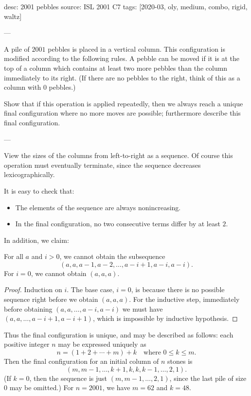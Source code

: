 desc: 2001 pebbles
source: ISL 2001 C7
tags: [2020-03, oly, medium, combo, rigid, waltz]

---

A pile of $2001$ pebbles is placed in a vertical column. This configuration is modified according to the following rules. A pebble can be moved if it is at the top of a column which contains at least two more pebbles than the column immediately to its right. (If there are no pebbles to the right, think of this as a column with $0$ pebbles.)

Show that if this operation is applied repeatedly, then we always reach a unique final configuration where no more moves are possible; furthermore describe this final configuration.

---

View the sizes of the columns from left-to-right as a sequence. Of course this operation must eventually terminate, since the sequence decreases lexicographically.

It is easy to check that:
\begin{itemize}[itemsep=0em]
    \item The elements of the sequence are always nonincreasing.
    \item In the final configuration, no two consecutive terms differ by at least $2$.
\end{itemize}
In addition, we claim:
\begin{claim*}
    For all $a$ and $i>0$, we cannot obtain the subsequence \[(a,a,a-1,a-2,\ldots,a-i+1,a-i,a-i).\]
    For $i=0$, we cannot obtain $(a,a,a)$.
\end{claim*}
\begin{proof}
    Induction on $i$. The base case, $i=0$, is because there is no possible sequence right before we obtain $(a,a,a)$. For the inductive step, immediately before obtaining $(a,a,\ldots,a-i,a-i)$ we must have $(a,a,\ldots,a-i+1,a-i+1)$, which is impossible by inductive hypothesis.
\end{proof}

Thus the final configuration is unique, and may be described as follows: each positive integer $n$ may be expressed uniquely as \[n=(1+2+\cdots+m)+k\quad\text{where }0\le k\le m.\]
Then the final configuration for an initial column of $n$ stones is \[(m,m-1,\ldots,k+1,k,k,k-1,\ldots,2,1).\]
(If $k=0$, then the sequence is just $(m,m-1,\ldots,2,1)$, since the last pile of size $0$ may be omitted.) For $n=2001$, we have $m=62$ and $k=48$.
